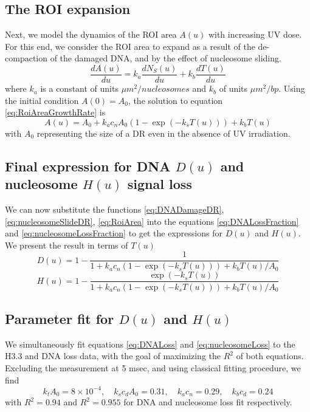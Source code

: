 \documentclass[12pt]{article}
\begin{document}
   \subsection{The ROI expansion}
	Next, we model the dynamics of the ROI area $A(u)$ with increasing UV
	dose. For this end, we consider the ROI area to expand as a result of the de-compaction of the damaged DNA, and by the effect of nucleosome sliding. 			
	\begin{equation}\label{eq:RoiAreaGrowthRate}
	\frac{dA(u)}{du}=k_a\frac{dN_S(u)}{du}+k_b\frac{dT(u)}{du}
	\end{equation}
	where $k_a$ is a constant of units $\mu m^2/ nucleosomes$ and $k_b$ of units $\mu m^2/ bp$. Using the initial condition $A(0) = A_0$, the solution to equation \eqref{eq:RoiAreaGrowthRate} is
	\begin{equation}\label{eq:RoiArea}
	A(u) = A_0+ k_ac_nA_0\left(1-\exp(-k_sT(u))\right)+k_bT(u)
	\end{equation}
	 with $A_0$ representing the size of a DR even in the absence of UV irradiation.
	 
	 \subsection{Final expression for DNA $D(u)$ and nucleosome $H(u)$ signal loss}
	We can now substitute the functions \eqref{eq:DNADamageDR}, \eqref{eq:nucleosomeSlideDR}, \eqref{eq:RoiArea} into the equations \eqref{eq:DNALossFraction} and \eqref{eq:nucleosomeLossFraction} to get the expressions for $D(u)$ and $H(u)$. We present the result in terms of $T(u)$
	\begin{equation}\label{eq:DNALoss}
	D(u) = 1-\frac{1}{1+ k_ac_n\left(1-\exp(-k_sT(u))\right)+k_bT(u)/A_0} 
	\end{equation}
	\begin{equation}\label{eq:nucleosomeLoss}
		H(u) = 1- \frac{\exp(-k_sT(u))}{1+ k_ac_n\left(1-\exp(-k_sT(u))\right)+k_bT(u)/A_0}
	\end{equation}
	
	\subsection{Parameter fit for $D(u)$ and $H(u)$}\label{subsection:parameterFit}
     We simultaneously fit equations \eqref{eq:DNALoss}  and \eqref{eq:nucleosomeLoss} to the H3.3 and DNA loss data, with the goal of maximizing the $R^2$ of both equations. Excluding the measurement at 5 msec, and using classical fitting procedure, we find
	\begin{equation*}
	k_tA_0 = 8\times 10^{-4}, \quad k_sc_dA_0 = 0.31,\quad k_ac_n = 0.29, \quad k_bc_d = 0.24
	\end{equation*}
	with $R^2 = 0.94$ and $R^2 = 0.955$ for DNA and nucleosome loss fit respectively.
	
\end{document}
